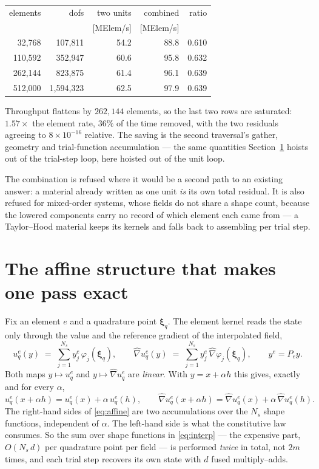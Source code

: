 \documentclass[11pt]{article}
\newcommand{\xhat}{\boldsymbol{\xi}}
\newcommand{\gradhat}{\widehat{\nabla}}
\begin{document}
\begin{center}
\begin{tabular}{rrrrr}
\toprule
elements & dofs & two units & combined & ratio \\
         &      & [MElem/s] & [MElem/s] & \\
\midrule
 32{,}768 &   107{,}811 & 54.2 & 88.8 & 0.610 \\
110{,}592 &   352{,}947 & 60.6 & 95.8 & 0.632 \\
262{,}144 &   823{,}875 & 61.4 & 96.1 & 0.639 \\
512{,}000 & 1{,}594{,}323 & 62.5 & 97.9 & 0.639 \\
\bottomrule
\end{tabular}
\end{center}

Throughput flattens by $262{,}144$ elements, so the last two rows are saturated:
$1.57\times$ the element rate, $36\%$ of the time removed, with the two residuals
agreeing to $8\times10^{-16}$ relative.  The saving is the second traversal's
gather, geometry and trial-function accumulation --- the same quantities
Section~\ref{sec:affine} hoists out of the trial-step loop, here hoisted out of
the unit loop.

The combination is refused where it would be a second path to an existing
answer: a material already written as one unit \emph{is} its own total residual.
It is also refused for mixed-order systems, whose fields do not share a shape
count, because the lowered components carry no record of which element each came
from --- a Taylor--Hood material keeps its kernels and falls back to assembling
per trial step.

\section{The affine structure that makes one pass exact}
\label{sec:affine}

Fix an element $e$ and a quadrature point $\xhat_q$.  The element kernel reads the
state only through the value and the reference gradient of the interpolated field,
\begin{equation}
  u^e_q(y) \;=\; \sum_{j=1}^{N_s} y^e_j\,\varphi_j(\xhat_q),
  \qquad
  \gradhat u^e_q(y) \;=\; \sum_{j=1}^{N_s} y^e_j\,\gradhat\varphi_j(\xhat_q),
  \qquad y^e = P_e y .
  \label{eq:interp}
\end{equation}
Both maps $y\mapsto u^e_q$ and $y\mapsto\gradhat u^e_q$ are \emph{linear}.  With
$y = x + \alpha h$ this gives, exactly and for every $\alpha$,
\begin{equation}
  u^e_q(x+\alpha h) = u^e_q(x) + \alpha\, u^e_q(h),
  \qquad
  \gradhat u^e_q(x+\alpha h) = \gradhat u^e_q(x) + \alpha\, \gradhat u^e_q(h).
  \label{eq:affine}
\end{equation}
The right-hand sides of \eqref{eq:affine} are two accumulations over the $N_s$
shape functions, independent of $\alpha$.  The left-hand side is what the
constitutive law consumes.  So the sum over shape functions in \eqref{eq:interp}
--- the expensive part, $O(N_s\,d)$ per quadrature point per field --- is performed
\emph{twice} in total, not $2m$ times, and each trial step recovers its own state
with $d$ fused multiply--adds.
\end{document}
